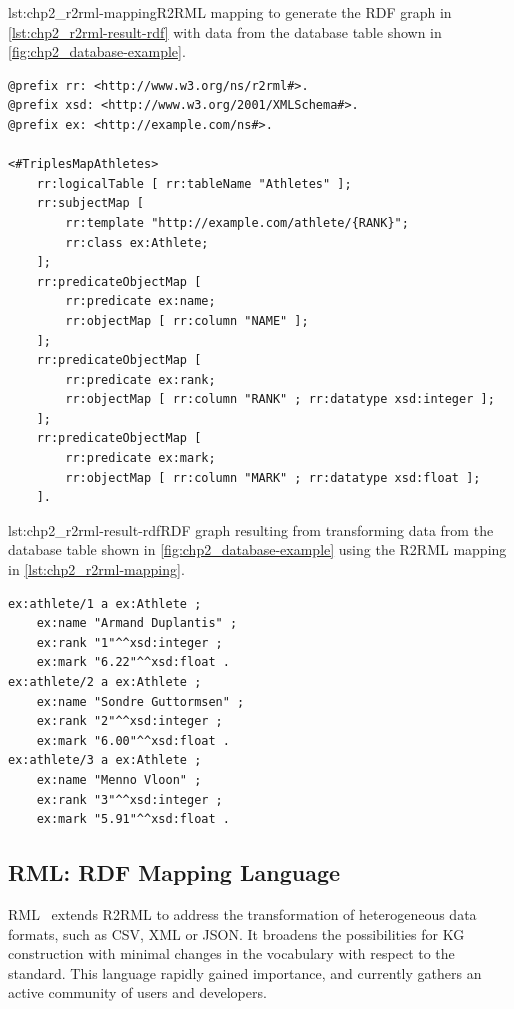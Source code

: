 \begin{captionedlisting}{lst:chp2_r2rml-mapping}{R2RML mapping to generate the RDF graph in \cref{lst:chp2_r2rml-result-rdf} with data from the database table shown in \cref{fig:chp2_database-example}.}
\centering
{\begin{lstlisting}[language=r2rml]
@prefix rr: <http://www.w3.org/ns/r2rml#>.
@prefix xsd: <http://www.w3.org/2001/XMLSchema#>.
@prefix ex: <http://example.com/ns#>.

<#TriplesMapAthletes>
    rr:logicalTable [ rr:tableName "Athletes" ];
    rr:subjectMap [
        rr:template "http://example.com/athlete/{RANK}";
        rr:class ex:Athlete;
    ];
    rr:predicateObjectMap [
        rr:predicate ex:name;
        rr:objectMap [ rr:column "NAME" ];
    ];
    rr:predicateObjectMap [
        rr:predicate ex:rank;
        rr:objectMap [ rr:column "RANK" ; rr:datatype xsd:integer ];
    ];
    rr:predicateObjectMap [
        rr:predicate ex:mark;
        rr:objectMap [ rr:column "MARK" ; rr:datatype xsd:float ];
    ].
\end{lstlisting}}
\end{captionedlisting}

\begin{minipage}{\textwidth}
\begin{captionedlisting}{lst:chp2_r2rml-result-rdf}{RDF graph resulting from transforming data from the database table shown in \cref{fig:chp2_database-example} using the R2RML mapping in \cref{lst:chp2_r2rml-mapping}.}
\centering\begin{lstlisting}[language=r2rml]
ex:athlete/1 a ex:Athlete ;
    ex:name "Armand Duplantis" ;
    ex:rank "1"^^xsd:integer ;
    ex:mark "6.22"^^xsd:float .
ex:athlete/2 a ex:Athlete ;
    ex:name "Sondre Guttormsen" ;
    ex:rank "2"^^xsd:integer ;
    ex:mark "6.00"^^xsd:float .
ex:athlete/3 a ex:Athlete ;
    ex:name "Menno Vloon" ;
    ex:rank "3"^^xsd:integer ;
    ex:mark "5.91"^^xsd:float .
\end{lstlisting}
\end{captionedlisting}
\end{minipage}



 
\subsection{RML: RDF Mapping Language}
\label{sec:chp2_RML}
RML~\parencite{Dimou2014rml} extends R2RML to address the transformation of heterogeneous data formats, such as CSV, XML or JSON. It broadens the possibilities for KG construction with minimal changes in the vocabulary with respect to the standard. This language rapidly gained importance, and currently gathers an active community of users and developers. 

